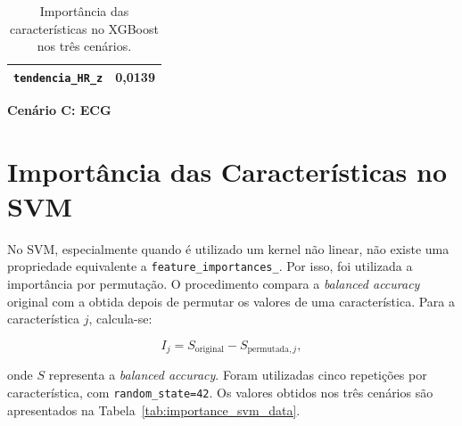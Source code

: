 \begin{table}[H]
\begin{minipage}{0.32\textwidth}
{\begin{tabular}{lr}
\texttt{tendencia\_HR\_z} & 0,0139\\\bottomrule\end{tabular}}
\end{minipage}\hfill
\begin{minipage}{0.32\textwidth}\centering
\textbf{Cenário C: ECG}
\end{minipage}
\caption{Importância das características no XGBoost nos três cenários.}
\label{tab:importance_xgboost_data}
\end{table}

\clearpage
\section{Importância das Características no SVM}

No SVM, especialmente quando é utilizado um kernel não linear, não existe uma propriedade equivalente a \texttt{feature\_importances\_}. Por isso, foi utilizada a importância por permutação. O procedimento compara a \textit{balanced accuracy} original com a obtida depois de permutar os valores de uma característica. Para a característica $j$, calcula-se:

\begin{equation}
I_j = S_{\mathrm{original}} - S_{\mathrm{permutada},j},
\end{equation}

onde $S$ representa a \textit{balanced accuracy}. Foram utilizadas cinco repetições por característica, com \texttt{random\_state=42}. Os valores obtidos nos três cenários são apresentados na Tabela~\ref{tab:importance_svm_data}.

